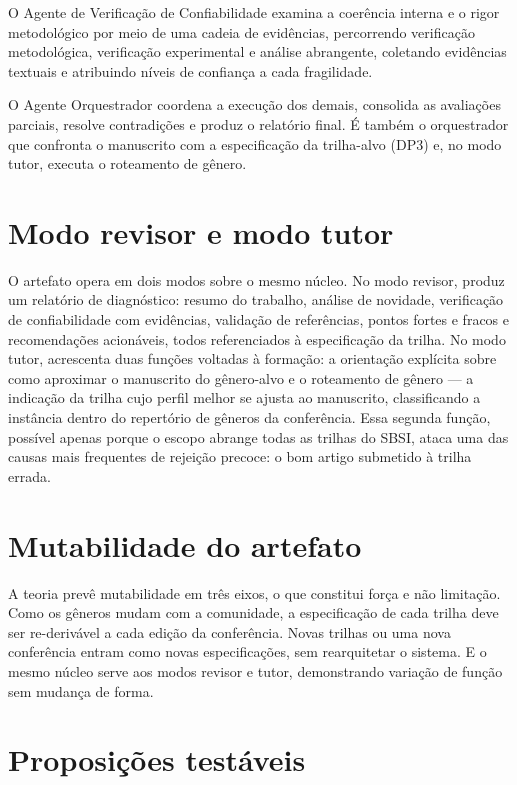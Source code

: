 O Agente de Verificação de Confiabilidade examina a coerência interna e o rigor metodológico por meio de uma cadeia de evidências, percorrendo verificação metodológica, verificação experimental e análise abrangente, coletando evidências textuais e atribuindo níveis de confiança a cada fragilidade.

O Agente Orquestrador coordena a execução dos demais, consolida as avaliações parciais, resolve contradições e produz o relatório final. É também o orquestrador que confronta o manuscrito com a especificação da trilha-alvo (DP3) e, no modo tutor, executa o roteamento de gênero.

\section{Modo revisor e modo tutor}

O artefato opera em dois modos sobre o mesmo núcleo. No modo revisor, produz um relatório de diagnóstico: resumo do trabalho, análise de novidade, verificação de confiabilidade com evidências, validação de referências, pontos fortes e fracos e recomendações acionáveis, todos referenciados à especificação da trilha. No modo tutor, acrescenta duas funções voltadas à formação: a orientação explícita sobre como aproximar o manuscrito do gênero-alvo e o roteamento de gênero — a indicação da trilha cujo perfil melhor se ajusta ao manuscrito, classificando a instância dentro do repertório de gêneros da conferência. Essa segunda função, possível apenas porque o escopo abrange todas as trilhas do SBSI, ataca uma das causas mais frequentes de rejeição precoce: o bom artigo submetido à trilha errada.

\section{Mutabilidade do artefato}

A teoria prevê mutabilidade em três eixos, o que constitui força e não limitação. Como os gêneros mudam com a comunidade, a especificação de cada trilha deve ser re-derivável a cada edição da conferência. Novas trilhas ou uma nova conferência entram como novas especificações, sem rearquitetar o sistema. E o mesmo núcleo serve aos modos revisor e tutor, demonstrando variação de função sem mudança de forma.

\section{Proposições testáveis}

